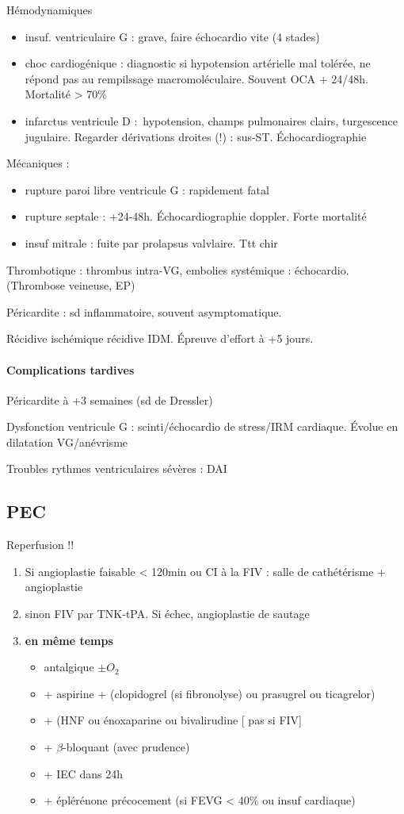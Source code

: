 Hémodynamiques
\begin{itemize}
  \item insuf. ventriculaire G : grave, faire échocardio vite (4 stades)
  \item choc cardiogénique : diagnostic si hypotension artérielle mal tolérée,
    ne répond pas au rempilssage macromoléculaire. Souvent \gls{OCA} + 24/48h.
    Mortalité > 70\%
  \item infarctus ventricule D : hypotension, champs pulmonaires clairs,
    turgescence jugulaire. Regarder dérivations droites (!) : sus-ST.
    Échocardiographie
\end{itemize}
Mécaniques :
\begin{itemize}
  \item rupture paroi libre ventricule G : rapidement fatal
  \item rupture septale : +24-48h. Échocardiographie doppler. Forte mortalité
  \item insuf mitrale : fuite par prolapsus valvlaire. Ttt chir
\end{itemize}
Thrombotique : thrombus intra-VG, embolies systémique : échocardio. (Thrombose
veineuse, EP)

Péricardite : sd inflammatoire, souvent asymptomatique.

Récidive ischémique \thus récidive IDM. Épreuve d'effort à  +5 jours.

\paragraph{Complications tardives}
Péricardite à +3 semaines (sd de Dressler)

Dysfonction ventricule G : scinti/échocardio de stress/IRM cardiaque. Évolue en
dilatation VG/anévrisme

Troubles rythmes ventriculaires sévères : \gls{DAI}

\subsection{PEC}
Reperfusion !!
\begin{enumerate}
\item Si angioplastie faisable < 120min ou CI à la \gls{FIV} : salle de cathétérisme +
  angioplastie
\item sinon FIV par TNK-tPA. Si échec, angioplastie de sautage
\item \textbf{en même temps } 
  \begin{itemize}
  \item antalgique $\pm O_2$
  \item + aspirine + (clopidogrel (si fibronolyse) ou prasugrel ou ticagrelor)
  \item + (HNF ou énoxaparine ou bivalirudine [\danger{} pas si FIV]
  \item + $\beta$-bloquant (avec prudence)
  \item + IEC dans 24h
  \item + éplérénone précocement (si FEVG < 40\% ou insuf cardiaque)
\end{itemize}
\end{enumerate}
  
